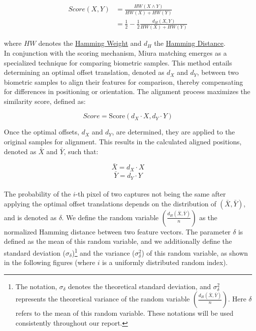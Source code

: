 \begin{equation} \label{eq:score}
    \begin{aligned}
        Score(X, Y) &= \frac{HW(X \land Y)}{HW(X) + HW(Y)}\\
        &= \frac{1}{2}-\frac{1}{2}\frac{d_H(X, Y)}{HW(X) + HW(Y)}
    \end{aligned}
\end{equation}

where \(HW\) denotes the \hyperref[def:Hamming Weight]{Hamming Weight} and \(d_H\) the \hyperref[def:Hamming Distance]{Hamming Distance}.\\ 
\newpage
In conjunction with the scoring mechanism, Miura matching emerges as a specialized technique for comparing biometric samples. This method entails determining an optimal offset translation, denoted as \(d_X\) and \(d_Y\), between two biometric samples to align their features for comparison, thereby compensating for differences in positioning or orientation. The alignment process maximizes the similarity score, defined as:

\[Score = \text{Score}(d_X \cdot X, d_Y \cdot Y)\]

Once the optimal offsets, \(d_X\) and \(d_Y\), are determined, they are applied to the original samples for alignment. This results in the calculated aligned positions, denoted as \(\bar{X}\) and \(\bar{Y}\), such that:

\[\bar{X} = d_X \cdot X\]
\[\bar{Y} = d_Y \cdot Y\]\\

The probability of the \(i\)-th pixel of two captures not being the same after applying the optimal offset translations depends on the distribution of \((\bar{X}, \bar{Y})\), and is denoted as \(\delta\). We define the random variable \(\left( \frac{d_H(\bar{X}, \bar{Y})}{n} \right)\) as the normalized Hamming distance between two feature vectors. The parameter \(\delta\) is defined as the mean of this random variable, and we additionally define the standard deviation (\(\sigma_{\delta}\))\footnote{The notation, \(\sigma_{\delta}\) denotes the theoretical standard deviation, and \(\sigma^2_{\delta} \) represents the theoretical variance of the random variable \(\left( \frac{d_H(\bar{X}, \bar{Y})}{n} \right)\). Here $\delta$ refers to the mean of this random variable. These notations will be used consistently throughout our report.} and the variance (\(\sigma^2_{\delta}\)) of this random variable, as shown in the following figures (where \(i\) is a uniformly distributed random index).


